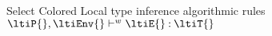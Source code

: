\begin{figure}
\begin{mathpar}

  \end{mathpar}
  \caption{Select Colored Local type inference algorithmic rules
  $\ltijudgement{\ltiP{}}
                 {\ltiEnv{}}
                 {\ltiE{}}
                 {\ltiT{}}$
  }
\end{figure}

